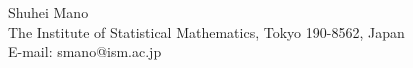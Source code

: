 \documentclass[a4paper,11pt]{article}
\theoremstyle{plain}
\theoremstyle{definition}
\begin{document}

%
%

%



\begin{flushleft}

Shuhei Mano\\
The Institute of Statistical Mathematics, Tokyo 190-8562, Japan\\
E-mail: smano@ism.ac.jp

\end{flushleft}
\end{document}

